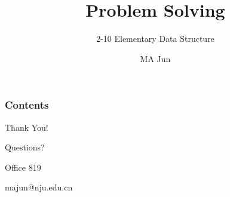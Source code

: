 \documentclass[UTF8,11pt,handout]{beamer}
\begin{document}
	\author{MA Jun}
	\title{Problem Solving}
	\subtitle{2-10 Elementary Data Structure}
\begin{frame}[plain]
	\maketitle
\end{frame}
\begin{frame}           %
	\addtocounter{framenumber}{-2}%
	\frametitle{Contents}
	\thispagestyle{empty}
	\tableofcontents[hideallsubsections]
\end{frame}

\begin{frame}
	\begin{block}{
		\begin{center}
		{\huge
			Thank You!
			
			\textcolor[rgb]{1,0,0}	{Questions?}
		}
		\end{center}
	}
	\end{block}
	\begin{block}{}
		\begin{center}
		
			Office 819
			
			majun@nju.edu.cn
		\end{center}
	\end{block}
	\end{frame}
\end{document}
